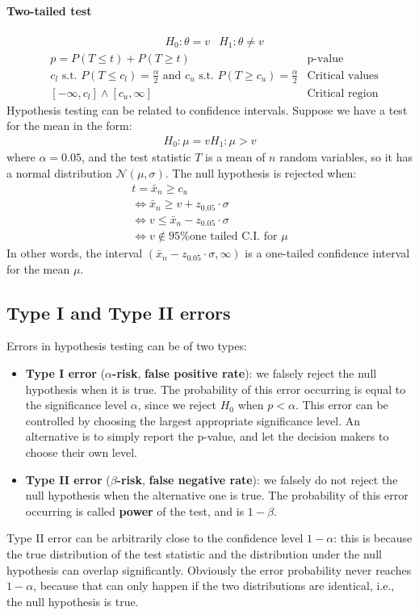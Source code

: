 \paragraph{Two-tailed test}
\begin{align*}
    &H_0 : \theta = v &H_1 : \theta \not = v
\end{align*}
\begin{align*}
    &p = P(T \leq t) + P(T \geq t) &\text{p-value}\\
    &c_l \text{ s.t. } P(T \leq c_l) = \frac{\alpha}{2} \text{ and } c_u \text{ s.t. } P(T \geq c_u) = \frac{\alpha}{2} &\text{Critical values} \\
    &[-\infty, c_l] \land [c_u, \infty] &\text{Critical region}
\end{align*}
Hypothesis testing can be related to confidence intervals. Suppose we have a test for the mean in the form:
\begin{align*}
    H_0 : \mu = v
    H_1 : \mu > v
\end{align*}
where $\alpha = 0.05$, and the test statistic $T$ is a mean of $n$ random variables, so it has a normal distribution $\mathcal{N}(\mu, \sigma)$. The null hypothesis is rejected when:
\begin{gather*}
    t = \bar{x}_n \geq c_u \\
    \iff \bar{x}_n \geq v + z_{0.05} \cdot \sigma \\
    \iff v \leq \bar{x}_n - z_{0.05} \cdot \sigma \\
    \iff v \not \in \text{95\% one tailed C.I. for } \mu
\end{gather*}
In other words, the interval $(\bar{x}_n - z_{0.05} \cdot \sigma, \infty)$ is a one-tailed confidence interval for the mean $\mu$.

\subsection{Type I and Type II errors}
Errors in hypothesis testing can be of two types:
\begin{itemize}
    \item \textbf{Type I error} (\textbf{$\alpha$-risk}, \textbf{false positive rate}): we falsely reject the null hypothesis when it is true. The probability of this error occurring is equal to the significance level $\alpha$, since we reject $H_0$ when $p < \alpha$. This error can be controlled by choosing the largest appropriate significance level. An alternative is to simply report the p-value, and let the decision makers to choose their own level.
    \item \textbf{Type II error} (\textbf{$\beta$-risk}, \textbf{false negative rate}): we falsely do not reject the null hypothesis when the alternative one is true. The probability of this error occurring is called \textbf{power} of the test, and is $1 - \beta$.
\end{itemize}
Type II error can be arbitrarily close to the confidence level $1 - \alpha$: this is because the true distribution of the test statistic and the distribution under the null hypothesis can overlap significantly. Obviously the error probability never reaches $1-\alpha$, because that can only happen if the two distributions are identical, i.e., the null hypothesis is true.

